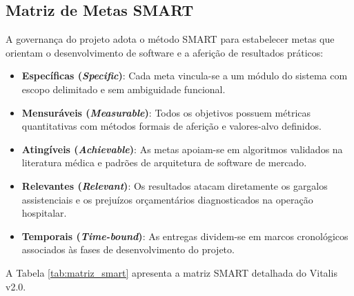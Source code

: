 \subsection{Matriz de Metas SMART}
\label{subsec:metas_smart}

A governança do projeto adota o método SMART para estabelecer metas que orientam o desenvolvimento de software e a aferição de resultados práticos:

\begin{itemize}[leftmargin=*]
    \item \textbf{Específicas (\textit{Specific})}: Cada meta vincula-se a um módulo do sistema com escopo delimitado e sem ambiguidade funcional.
    \item \textbf{Mensuráveis (\textit{Measurable})}: Todos os objetivos possuem métricas quantitativas com métodos formais de aferição e valores-alvo definidos.
    \item \textbf{Atingíveis (\textit{Achievable})}: As metas apoiam-se em algoritmos validados na literatura médica e padrões de arquitetura de software de mercado.
    \item \textbf{Relevantes (\textit{Relevant})}: Os resultados atacam diretamente os gargalos assistenciais e os prejuízos orçamentários diagnosticados na operação hospitalar.
    \item \textbf{Temporais (\textit{Time-bound})}: As entregas dividem-se em marcos cronológicos associados às fases de desenvolvimento do projeto.
\end{itemize}

A Tabela \ref{tab:matriz_smart} apresenta a matriz SMART detalhada do Vitalis v2.0.

